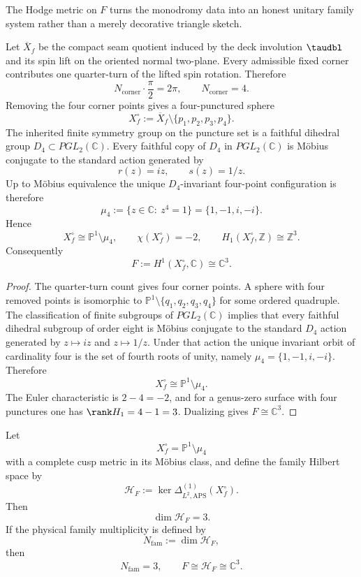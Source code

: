 The Hodge metric on $F$ turns the monodromy data into an honest unitary family system rather than a merely decorative triangle sketch.

\begin{theorem}
\label{thm:topological-family-closure}
Let $\overline X_f$ be the compact seam quotient induced by the deck involution $\taudbl$ and its
spin lift on the oriented normal two-plane. Every admissible fixed corner contributes one
quarter-turn of the lifted spin rotation. Therefore
\[
N_{\mathrm{corner}}\cdot \frac{\pi}{2}=2\pi,
\qquad
N_{\mathrm{corner}}=4.
\]
Removing the four corner points gives a four-punctured sphere
\[
X_f^\circ:=\overline X_f\setminus\{p_1,p_2,p_3,p_4\}.
\]
The inherited finite symmetry group on the puncture set is a faithful dihedral group
$D_4\subset PGL_2(\mathbb C)$. Every faithful copy of $D_4$ in $PGL_2(\mathbb C)$ is M\"obius
conjugate to the standard action generated by
\[
r(z)=iz,
\qquad
s(z)=1/z.
\]
Up to M\"obius equivalence the unique $D_4$-invariant four-point configuration is therefore
\[
\mu_4:=\{z\in\mathbb C:\ z^4=1\}=\{1,-1,i,-i\}.
\]
Hence
\[
X_f^\circ\cong \mathbb P^1\setminus\mu_4,
\qquad
\chi(X_f^\circ)=-2,
\qquad
H_1(X_f^\circ,\mathbb Z)\cong \mathbb Z^3.
\]
Consequently
\[
F:=H^1(X_f^\circ,\mathbb C)\cong \mathbb C^3.
\]
\end{theorem}

\begin{proof}
The quarter-turn count gives four corner points. A sphere with four removed points is isomorphic to
$\mathbb P^1\setminus\{q_1,q_2,q_3,q_4\}$ for some ordered quadruple. The classification of finite
subgroups of $PGL_2(\mathbb C)$ implies that every faithful dihedral subgroup of order eight is
M\"obius conjugate to the standard $D_4$ action generated by $z\mapsto iz$ and $z\mapsto 1/z$.
Under that action the unique invariant orbit of cardinality four is the set of fourth roots of
unity, namely $\mu_4=\{1,-1,i,-i\}$. Therefore
\[
X_f^\circ\cong \mathbb P^1\setminus\mu_4.
\]
The Euler characteristic is $2-4=-2$, and for a genus-zero surface with four punctures one has
$\rank H_1=4-1=3$. Dualizing gives $F\cong\mathbb C^3$.
\end{proof}

\begin{theorem}
\label{thm:harmonic-family-modes}
Let
\[
X_f^\circ=\mathbb P^1\setminus\mu_4
\]
with a complete cusp metric in its M\"obius class, and define the family Hilbert space by
\[
\mathcal H_F:=\ker \Delta^{(1)}_{L^2,\mathrm{APS}}(X_f^\circ).
\]
Then
\[
\dim\mathcal H_F=3.
\]
If the physical family multiplicity is defined by
\[
N_{\mathrm{fam}}:=\dim\mathcal H_F,
\]
then
\[
N_{\mathrm{fam}}=3,
\qquad
F\cong \mathcal H_F\cong \mathbb C^3.
\]
\end{theorem}

